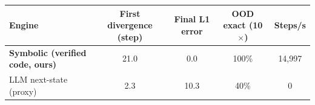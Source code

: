 \begin{tabular}{lcccc}
\toprule
Engine & First divergence (step) & Final L1 error & OOD exact (10$\times$) & Steps/s \\
\midrule
\textbf{Symbolic (verified code, ours)} & 21.0 & 0.0 & 100\% & 14,997 \\
LLM next-state (proxy) & 2.3 & 10.3 & 40\% & 0 \\
\bottomrule
\end{tabular}
